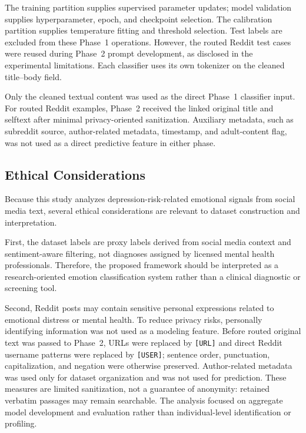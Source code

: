 \documentclass{ieeeaccess}
\begin{document}
The training partition supplies supervised parameter updates; model validation supplies hyperparameter, epoch, and checkpoint selection. The calibration partition supplies temperature fitting and threshold selection. Test labels are excluded from these Phase~1 operations. However, the routed Reddit test cases were reused during Phase~2 prompt development, as disclosed in the experimental limitations. Each classifier uses its own tokenizer on the cleaned title--body field.

Only the cleaned textual content was used as the direct Phase~1 classifier input. For routed Reddit examples, Phase~2 received the linked original title and selftext after minimal privacy-oriented sanitization. Auxiliary metadata, such as subreddit source, author-related metadata, timestamp, and adult-content flag, was not used as a direct predictive feature in either phase.

\subsection{Ethical Considerations}

Because this study analyzes depression-risk-related emotional signals from social media text, several ethical considerations are relevant to dataset construction and interpretation.

First, the dataset labels are proxy labels derived from social media context and sentiment-aware filtering, not diagnoses assigned by licensed mental health professionals. Therefore, the proposed framework should be interpreted as a research-oriented emotion classification system rather than a clinical diagnostic or screening tool.

Second, Reddit posts may contain sensitive personal expressions related to emotional distress or mental health. To reduce privacy risks, personally identifying information was not used as a modeling feature. Before routed original text was passed to Phase~2, URLs were replaced by \texttt{[URL]} and direct Reddit username patterns were replaced by \texttt{[USER]}; sentence order, punctuation, capitalization, and negation were otherwise preserved. Author-related metadata was used only for dataset organization and was not used for prediction. These measures are limited sanitization, not a guarantee of anonymity: retained verbatim passages may remain searchable. The analysis focused on aggregate model development and evaluation rather than individual-level identification or profiling.
\end{document}
